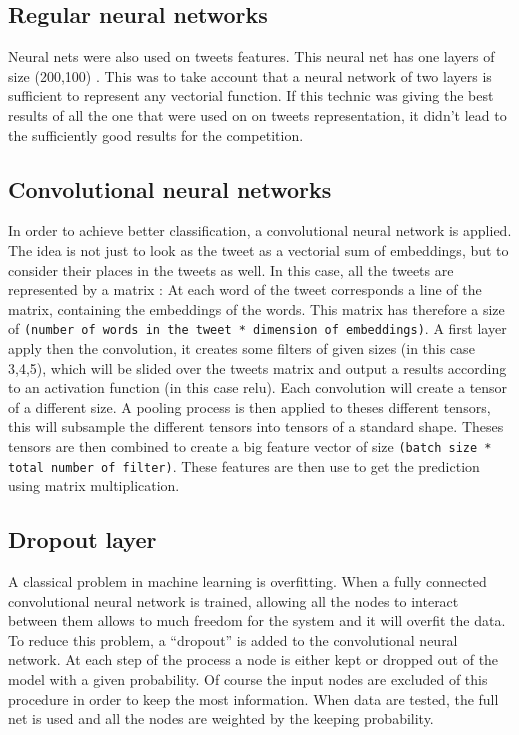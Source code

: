\subsection{Regular neural networks}

Neural nets were also used on tweets features. This neural net has one layers of size (200,100) . This was to take account that a neural network of  two layers is sufficient to represent any vectorial function.  If this technic was giving the best results of all the one that were used on on tweets representation, it didn't lead to the sufficiently good results for the competition. 

\subsection{Convolutional neural networks}

In order to achieve better classification, a convolutional neural network is applied. The idea is not just to look as the tweet as a vectorial sum of embeddings, but to consider their places in the tweets as well. In this case, all the tweets are represented by a matrix :  At each word of the tweet corresponds a line of the matrix, containing the embeddings of the words. This matrix has therefore a size of \texttt{(number of words in the tweet * dimension of embeddings)}. A first layer apply then the convolution, it creates some filters of given sizes (in this case  3,4,5), which will be slided over the tweets matrix and output a results according to an activation function (in this case relu). Each convolution will create a tensor of a different size. A pooling process is then applied to theses different tensors, this will subsample the different tensors into tensors of a standard shape. Theses tensors are then combined to create a big feature vector of size \texttt{(batch size * total number of filter)}. These features are then use to get the prediction using matrix multiplication. 

\subsection{Dropout layer}
A classical problem in machine learning is overfitting. When a fully connected convolutional neural network is trained, allowing all the nodes to interact between them allows to much freedom for the system and it will overfit the data. To reduce this problem, a ``dropout'' is added to the convolutional neural network. At each step of the process a node is either kept or dropped out of the model with a given probability.  Of course the input nodes are excluded of this procedure in order to keep the most information. When data are tested, the full net is used and all the nodes are weighted by the keeping probability. 

